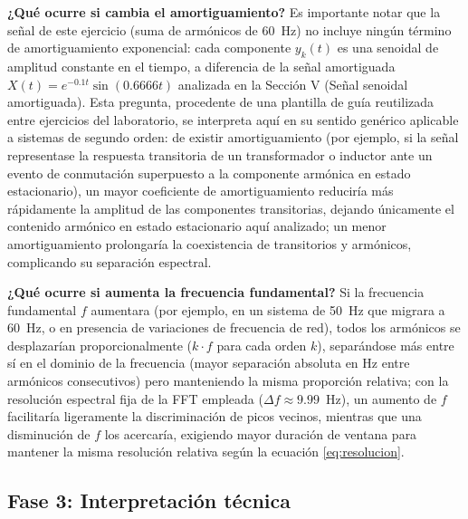 \documentclass[conference]{IEEEtran}
\begin{document}
\textbf{¿Qué ocurre si cambia el amortiguamiento?} Es importante notar que la señal de este ejercicio (suma de armónicos de 60~Hz) no incluye ningún término de amortiguamiento exponencial: cada componente $y_k(t)$ es una senoidal de amplitud constante en el tiempo, a diferencia de la señal amortiguada $X(t)=e^{-0.1t}\sin(0.6666t)$ analizada en la Sección V (Señal senoidal amortiguada). Esta pregunta, procedente de una plantilla de guía reutilizada entre ejercicios del laboratorio, se interpreta aquí en su sentido genérico aplicable a sistemas de segundo orden: de existir amortiguamiento (por ejemplo, si la señal representase la respuesta transitoria de un transformador o inductor ante un evento de conmutación superpuesto a la componente armónica en estado estacionario), un mayor coeficiente de amortiguamiento reduciría más rápidamente la amplitud de las componentes transitorias, dejando únicamente el contenido armónico en estado estacionario aquí analizado; un menor amortiguamiento prolongaría la coexistencia de transitorios y armónicos, complicando su separación espectral.

\textbf{¿Qué ocurre si aumenta la frecuencia fundamental?} Si la frecuencia fundamental $f$ aumentara (por ejemplo, en un sistema de 50~Hz que migrara a 60~Hz, o en presencia de variaciones de frecuencia de red), todos los armónicos se desplazarían proporcionalmente ($k\cdot f$ para cada orden $k$), separándose más entre sí en el dominio de la frecuencia (mayor separación absoluta en Hz entre armónicos consecutivos) pero manteniendo la misma proporción relativa; con la resolución espectral fija de la FFT empleada ($\Delta f\approx9.99$~Hz), un aumento de $f$ facilitaría ligeramente la discriminación de picos vecinos, mientras que una disminución de $f$ los acercaría, exigiendo mayor duración de ventana para mantener la misma resolución relativa según la ecuación \eqref{eq:resolucion}.

\subsection{Fase 3: Interpretación técnica}
\end{document}
